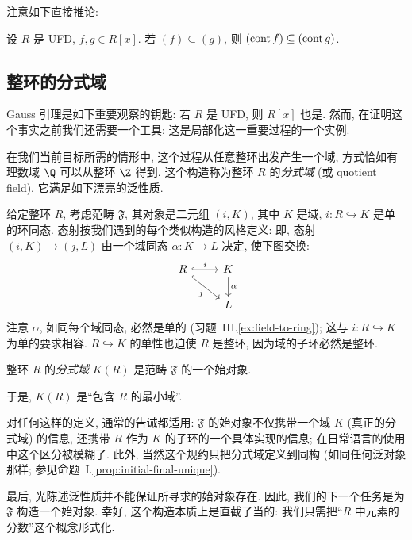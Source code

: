 \noindent 注意如下直接推论:

\begin{corollary}\label{cor:content-contains}
设 $R$ 是 UFD, $f,g\in R[x]$. 若 $(f)\subseteq (g)$, 则 $(\operatorname{cont} f)\subseteq (\operatorname{cont} g)$.
\end{corollary}

\subsection{整环的分式域}
\label{subsec:field-of-fractions}

Gauss 引理是如下重要观察的钥匙: 若 $R$ 是 UFD, 则 $R[x]$ 也是. 然而, 在证明这个事实之前我们还需要一个工具; 这是局部化这一重要过程的一个实例.

\noindent 在我们当前目标所需的情形中, 这个过程从任意整环出发产生一个域, 方式恰如有理数域 $\Q$ 可以从整环 $\Z$ 得到. 这个构造称为整环 $R$ 的\emph{分式域} (或 quotient field). 它满足如下漂亮的泛性质.

\noindent 给定整环 $R$, 考虑范畴 $\mathfrak{F}$, 其对象是二元组 $(i,K)$, 其中 $K$ 是域, $i:R\hookrightarrow K$ 是单的环同态. 态射按我们遇到的每个类似构造的风格定义: 即, 态射 $(i,K)\to (j,L)$ 由一个域同态 $\alpha:K\to L$ 决定, 使下图交换:
\[
\begin{tikzcd}
R \ar[r,hook, "i"] \ar[dr,hook, "j"'] & K \ar[d, "\alpha"] \\
& L
\end{tikzcd}
\]
注意 $\alpha$, 如同每个域同态, 必然是单的 (习题~III.\ref{ex:field-to-ring}); 这与 $i:R\hookrightarrow K$ 为单的要求相容. $R\hookrightarrow K$ 的单性也迫使 $R$ 是整环, 因为域的子环必然是整环.

\begin{definition}\label{def:field-of-fractions}
整环 $R$ 的\emph{分式域} $K(R)$ 是范畴 $\mathfrak{F}$ 的一个始对象.
\end{definition}

\noindent 于是, $K(R)$ 是``包含 $R$ 的最小域''.

\noindent 对任何这样的定义, 通常的告诫都适用: $\mathfrak{F}$ 的始对象不仅携带一个域 $K$ (真正的分式域) 的信息, 还携带 $R$ 作为 $K$ 的子环的一个具体实现的信息; 在日常语言的使用中这个区分被模糊了. 此外, 当然这个规约只把分式域定义到同构 (如同任何泛对象那样; 参见命题~I.\ref{prop:initial-final-unique}).

\noindent 最后, 光陈述泛性质并不能保证所寻求的始对象存在. 因此, 我们的下一个任务是为 $\mathfrak{F}$ 构造一个始对象. 幸好, 这个构造本质上是直截了当的: 我们只需把``$R$ 中元素的分数''这个概念形式化.

